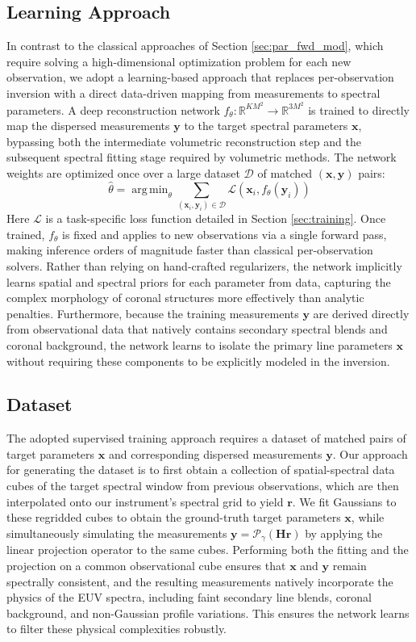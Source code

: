 \documentclass[linenumbers,twocolumn]{aastex7}
\DeclareMathOperator*{\argmin}{arg\,min}
\begin{document}
\subsection{Learning Approach}
In contrast to the classical approaches of Section \ref{sec:par_fwd_mod}, which
require solving a high-dimensional optimization problem for each new observation,
we adopt a learning-based approach that replaces per-observation inversion with a
direct data-driven mapping from measurements to spectral parameters. A deep
reconstruction network $f_\theta: \mathbb R^{KM^2} \rightarrow \mathbb R^{3M^2}$
is trained to directly map the dispersed measurements $\bm y$ to the target
spectral parameters $\bm x$, bypassing both the intermediate volumetric
reconstruction step and the subsequent spectral fitting stage required by
volumetric methods. The network weights are optimized once over a large dataset
$\mathcal D$ of matched $(\bm x, \bm y)$ pairs:
\begin{equation}
\hat {\theta} = \argmin_{\theta} \sum_{(\bm x_i, \bm y_i) \in \mathcal D}
\mathcal{L}(\bm x_i, f_\theta (\bm y_i))
\label{eq:erm}
\end{equation}
Here $\mathcal{L}$ is a task-specific loss function detailed in Section
\ref{sec:training}. Once trained, $f_\theta$ is fixed and applies to new
observations via a single forward pass, making inference orders of magnitude faster than classical
per-observation solvers. Rather than relying on hand-crafted regularizers, the
network implicitly learns spatial and spectral priors for each parameter from
data, capturing the complex morphology of coronal structures more effectively
than analytic penalties. Furthermore, because the training measurements
$\bm y$ are derived directly from observational data that natively contains
secondary spectral blends and coronal background, the network learns to isolate
the primary line parameters $\bm x$ without requiring these components to be
explicitly modeled in the inversion.

\subsection{Dataset} \label{sec:dataset}
The adopted supervised training approach requires a dataset of matched pairs of
target parameters $\bm x$ and corresponding dispersed measurements $\bm y$. Our
approach for generating the dataset is to first obtain a collection of
spatial-spectral data cubes of the target spectral window from previous observations, which are then
interpolated onto our instrument's spectral grid to yield $\bm r$. We fit
Gaussians to these regridded cubes to obtain the ground-truth target parameters
$\bm x$, while simultaneously simulating the measurements $\bm y =
\mathcal{P}_\gamma(\bm H \bm r)$ by applying the linear projection operator to
the same cubes. Performing both the fitting and the projection on a common
observational cube ensures that $\bm x$ and $\bm y$ remain spectrally
consistent, and the resulting measurements natively incorporate the physics of
the EUV spectra, including faint secondary line blends, coronal background, and
non-Gaussian profile variations. This ensures the network learns to filter
these physical complexities robustly.
\end{document}
